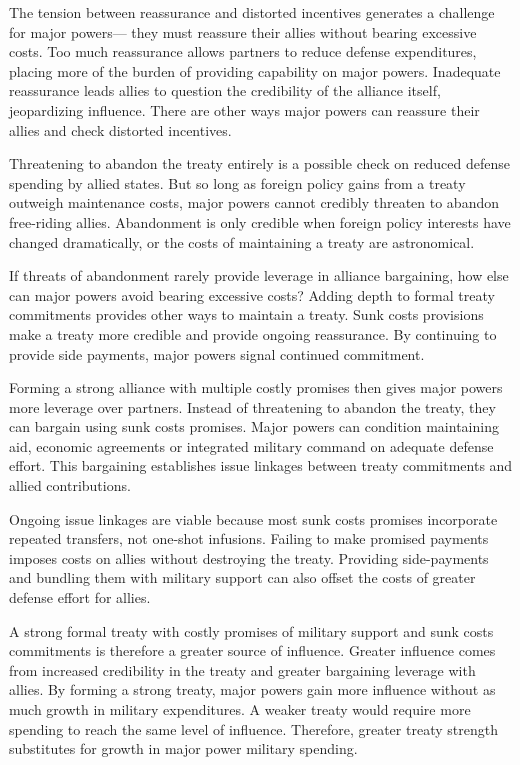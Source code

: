\documentclass[12pt]{article}
\begin{document}
The tension between reassurance and distorted incentives generates a challenge for major powers--- they must reassure their allies without bearing excessive costs.
Too much reassurance allows partners to reduce defense expenditures, placing more of the burden of providing capability on major powers. 
Inadequate reassurance leads allies to question the credibility of the alliance itself, jeopardizing influence.   
There are other ways major powers can reassure their allies and check distorted incentives. 


Threatening to abandon the treaty entirely is a possible check on reduced defense spending by allied states. 
But so long as foreign policy gains from a treaty outweigh maintenance costs, major powers cannot credibly threaten to abandon free-riding allies. 
Abandonment is only credible when foreign policy interests have changed dramatically, or the costs of maintaining a treaty are astronomical. 


If threats of abandonment rarely provide leverage in alliance bargaining, how else can major powers avoid bearing excessive costs? 
Adding depth to formal treaty commitments provides other ways to maintain a treaty.
Sunk costs provisions make a treaty more credible and provide ongoing reassurance.
By continuing to provide side payments, major powers signal continued commitment. 

 
Forming a strong alliance with multiple costly promises then gives major powers more leverage over partners. 
Instead of threatening to abandon the treaty, they can bargain using sunk costs promises. 
Major powers can condition maintaining aid, economic agreements or integrated military command on adequate defense effort.
This bargaining establishes issue linkages between treaty commitments and allied contributions. 


Ongoing issue linkages are viable because most sunk costs promises incorporate repeated transfers, not one-shot infusions. 
Failing to make promised payments imposes costs on allies without destroying the treaty. 
Providing side-payments and bundling them with military support can also offset the costs of greater defense effort for allies. 


A strong formal treaty with costly promises of military support and sunk costs commitments is therefore a greater source of influence.
Greater influence comes from increased credibility in the treaty and greater bargaining leverage with allies.  
By forming a strong treaty, major powers gain more influence without as much growth in military expenditures. 
A weaker treaty would require more spending to reach the same level of influence. 
Therefore, greater treaty strength substitutes for growth in major power military spending. 
\end{document}

